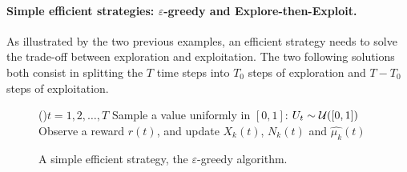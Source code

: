 \paragraph{Simple efficient strategies: $\varepsilon$-greedy and Explore-then-Exploit.}

As illustrated by the two previous examples, an efficient strategy needs to solve the trade-off between exploration and exploitation.
The two following solutions both consist in splitting the $T$ time steps into $T_0$ steps of exploration and $T-T_0$ steps of exploitation.


\begin{figure}[h!]
	\centering
    \begin{framed}
	\begin{algorithm}[H]
		\For(){$t = 1, 2, \dots, T$}{
            Sample a value uniformly in $[0,1]$: $U_t\sim\mathcal{U}([0,1])$\\
            Observe a reward $r(t)$, and update $X_k(t)$, $N_k(t)$ and $\widehat{\mu_k}(t)$
		}
		\caption[A simple efficient strategy, the $\varepsilon$-greedy algorithm.]{A simple efficient strategy, the \textcolor{deeppurple}{$\varepsilon$-greedy} algorithm.}
		\label{algo:2:simpleStrategies_EpsilonGreedy}
	\end{algorithm}
	\end{framed}
\end{figure}


